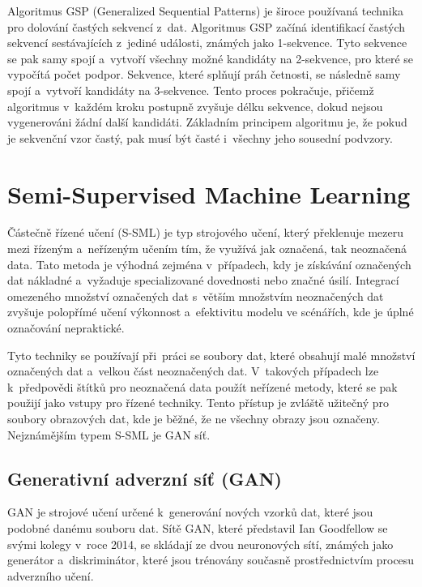 \newpage

Algoritmus GSP (Generalized Sequential Patterns)\cite{Srikant1996} je široce používaná technika pro dolování častých sekvencí z~dat. Algoritmus GSP začíná identifikací častých sekvencí sestávajících z~jediné události, známých jako 1-sekvence. Tyto sekvence se pak samy spojí a~vytvoří všechny možné kandidáty na 2-sekvence, pro které se vypočítá počet podpor. Sekvence, které splňují práh četnosti, se následně samy spojí a~vytvoří kandidáty na 3-sekvence. Tento proces pokračuje, přičemž algoritmus v~každém kroku postupně zvyšuje délku sekvence, dokud nejsou vygenerováni žádní další kandidáti. Základním principem algoritmu je, že pokud je sekvenční vzor častý, pak musí být časté i~všechny jeho sousední podvzory.

\newpage

\section{Semi-Supervised Machine Learning}
Částečně řízené učení (S-SML) je typ strojového učení, který překlenuje mezeru mezi řízeným a~neřízeným učením tím, že využívá jak označená, tak neoznačená data. Tato metoda je výhodná zejména v~případech, kdy je získávání označených dat nákladné a~vyžaduje specializované dovednosti nebo značné úsilí. Integrací omezeného množství označených dat s~větším množstvím neoznačených dat zvyšuje polopřímé učení výkonnost a~efektivitu modelu ve scénářích, kde je úplné označování nepraktické.

Tyto techniky se používají při~práci se soubory dat, které obsahují malé množství označených dat a~velkou část neoznačených dat. V~takových případech lze k~předpovědi štítků pro neoznačená data použít neřízené metody, které se pak použijí jako vstupy pro řízené techniky. Tento přístup je zvláště užitečný pro soubory obrazových dat, kde je běžné, že ne všechny obrazy jsou označeny. Nejznámějším typem S-SML je GAN síť.

\subsection{Generativní adverzní síť (GAN)}
GAN\cite{Goodfellow2021} je strojové učení určené k~generování nových vzorků dat, které jsou podobné danému souboru dat. Sítě GAN, které představil Ian Goodfellow se svými kolegy v~roce 2014, se skládají ze dvou neuronových sítí, známých jako generátor a~diskriminátor, které jsou trénovány současně prostřednictvím procesu adverzního učení.

